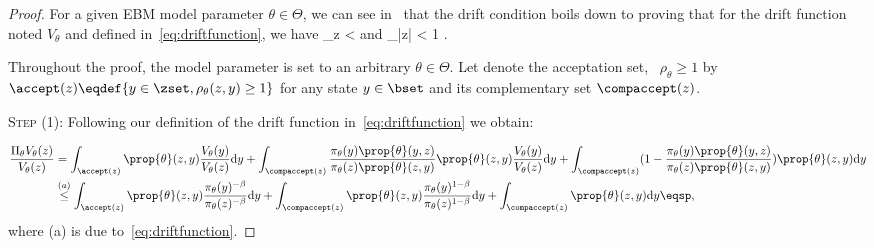 \documentclass{article} %
\begin{document}
\begin{proof}
For a given EBM model parameter $\theta \in \Theta$, we can see in~\citet{jarner2000geometric} that the drift condition boils down to proving that for the drift function noted $V_\theta$ and defined in~\eqref{eq:driftfunction}, we have
\beq\label{mainproof}
\sup \limits_{z \in \zset}   < \infty \quad \textrm{and} \quad \lim \sup \limits_{|z| \to \infty}   < 1 \eqsp.
\eeq

Throughout the proof, the model parameter is set to an arbitrary $\theta \in \Theta$.
Let denote the acceptation set, \ie\ $\rho_\theta \geq 1$ by $\accept(z) \eqdef \{ y \in \zset, \rho_\theta(z,y) \geq 1 \}$ for any state $y \in \bset$ and its complementary set $\compaccept(z)$.

\medskip
\noindent \textsc{Step (1): } Following our definition of the drift function in~\eqref{eq:driftfunction} we obtain:

\begin{align}\label{eq:main1}
 \frac{\Pi_\theta V_\theta(z)}{V_\theta(z)} & = \int_{\accept(z)}  \prop{\theta}(z,y) \frac{V_\theta(y)}{V_\theta(z)} \textrm{d}y +  \int_{\compaccept(z)} \frac{\pi_\theta(y)\prop{\theta}(y,z)}{\pi_\theta(z)\prop{\theta}(z,y)} \prop{\theta}(z,y) \frac{V_\theta(y)}{V_\theta(z)} \textrm{d}y +  \int_{\compaccept(z)} (1 - \frac{\pi_\theta(y)\prop{\theta}(y,z)}{\pi_\theta(z)\prop{\theta}(z,y)}) \prop{\theta}(z,y)  \textrm{d}y\\
 &  \overset{(a)}{\leq} \int_{\accept(z)}  \prop{\theta}(z,y) \frac{\pi_\theta(y)^{-\beta}}{\pi_\theta(z)^{-\beta}} \textrm{d}y  + \int_{\compaccept(z)} \prop{\theta}(z,y) \frac{\pi_\theta(y)^{1-\beta}}{\pi_\theta(z)^{1-\beta}}\textrm{d}y +  \int_{\compaccept(z)} \prop{\theta}(z,y)  \textrm{d}y \eqsp,
\end{align}
where (a) is due to~\eqref{eq:driftfunction}.


\end{proof}
\end{document}
